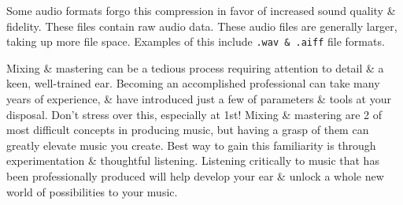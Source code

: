 \documentclass{article}
\begin{document}
\begin{itemize}
\begin{itemize}
		Some audio formats forgo this compression in favor of increased sound quality \& fidelity. These files contain raw audio data. These audio files are generally larger, taking up more file space. Examples of this include {\tt.wav \& .aiff} file formats.
		
		Mixing \& mastering can be a tedious process requiring attention to detail \& a keen, well-trained ear. Becoming an accomplished professional can take many years of experience, \& have introduced just a few of parameters \& tools at your disposal. Don't stress over this, especially at 1st! Mixing \& mastering are 2 of most difficult concepts in producing music, but having a grasp of them can greatly elevate music you create. Best way to gain this familiarity is through experimentation \& thoughtful listening. Listening critically to music that has been professionally produced will help develop your ear \& unlock a whole new world of possibilities to your music.
		

\end{itemize}
\end{itemize}
\end{document}
